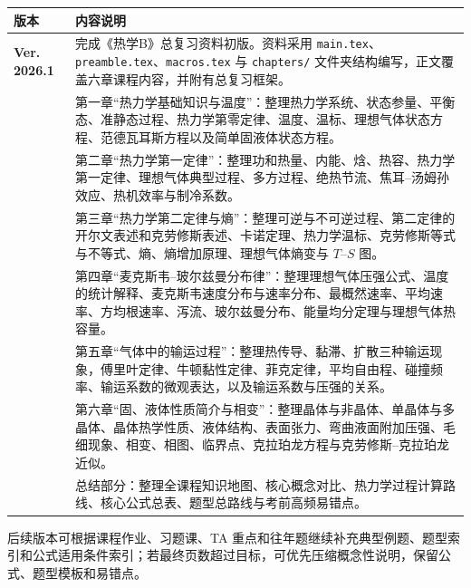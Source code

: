 \documentclass[UTF8,fontset=fandol,zihao=-4,openany,oneside]{ctexbook}
\begin{document}
\begin{longtable}{@{}p{}p{}@{}}
\toprule
\textbf{版本} & \textbf{内容说明}\\
\midrule
\endhead

\textbf{Ver. 2026.1} &
完成《热学B》总复习资料初版。资料采用 \texttt{main.tex}、\texttt{preamble.tex}、\texttt{macros.tex} 与 \texttt{chapters/} 文件夹结构编写，正文覆盖六章课程内容，并附有总复习框架。\\[0.6em]

&
第一章“热力学基础知识与温度”：整理热力学系统、状态参量、平衡态、准静态过程、热力学第零定律、温度、温标、理想气体状态方程、范德瓦耳斯方程以及简单固液体状态方程。\\[0.6em]

&
第二章“热力学第一定律”：整理功和热量、内能、焓、热容、热力学第一定律、理想气体典型过程、多方过程、绝热节流、焦耳--汤姆孙效应、热机效率与制冷系数。\\[0.6em]

&
第三章“热力学第二定律与熵”：整理可逆与不可逆过程、第二定律的开尔文表述和克劳修斯表述、卡诺定理、热力学温标、克劳修斯等式与不等式、熵、熵增加原理、理想气体熵变与 \(T\)--\(S\) 图。\\[0.6em]

&
第四章“麦克斯韦--玻尔兹曼分布律”：整理理想气体压强公式、温度的统计解释、麦克斯韦速度分布与速率分布、最概然速率、平均速率、方均根速率、泻流、玻尔兹曼分布、能量均分定理与理想气体热容量。\\[0.6em]

&
第五章“气体中的输运过程”：整理热传导、黏滞、扩散三种输运现象，傅里叶定律、牛顿黏性定律、菲克定律，平均自由程、碰撞频率、输运系数的微观表达，以及输运系数与压强的关系。\\[0.6em]

&
第六章“固、液体性质简介与相变”：整理晶体与非晶体、单晶体与多晶体、晶体热学性质、液体结构、表面张力、弯曲液面附加压强、毛细现象、相变、相图、临界点、克拉珀龙方程与克劳修斯--克拉珀龙近似。\\[0.6em]

&
总结部分：整理全课程知识地图、核心概念对比、热力学过程计算路线、核心公式总表、题型总路线与考前高频易错点。\\

\bottomrule
\end{longtable}

\begin{KeyBox}[后续修订方向]
后续版本可根据课程作业、习题课、TA 重点和往年题继续补充典型例题、题型索引和公式适用条件索引；若最终页数超过目标，可优先压缩概念性说明，保留公式、题型模板和易错点。
\end{KeyBox}
\end{document}
